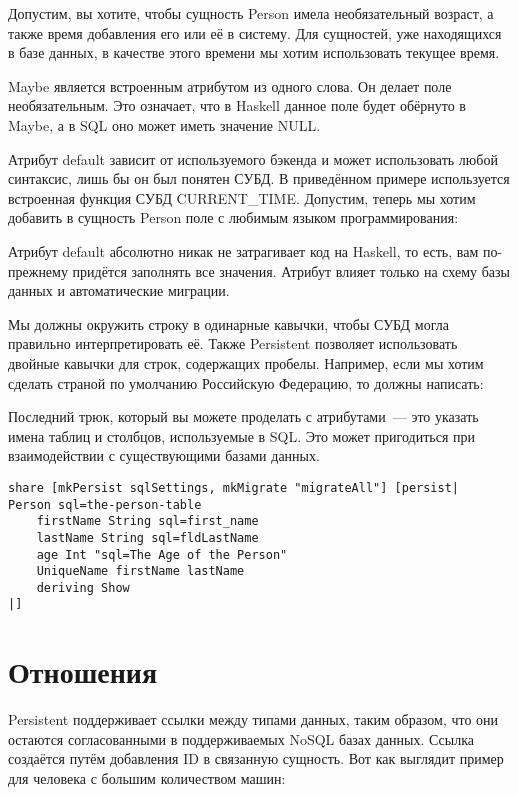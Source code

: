 Допустим, вы хотите, чтобы сущность Person имела необязательный возраст, а
также время добавления его или её в систему. Для сущностей, уже находящихся в
базе данных, в качестве этого времени мы хотим использовать текущее время.


Maybe является встроенным атрибутом из одного слова. Он делает поле
необязательным. Это означает, что в Haskell данное поле будет обёрнуто в Maybe,
а в SQL оно может иметь значение NULL.

Атрибут default зависит от используемого бэкенда и может использовать любой
синтаксис, лишь бы он был понятен СУБД. В приведённом примере используется
встроенная функция СУБД CURRENT\_TIME. Допустим, теперь мы хотим добавить в
сущность Person поле с любимым языком программирования:


\begin{remark}
    Атрибут default абсолютно никак не затрагивает код на Haskell, то есть, вам
    по-прежнему придётся заполнять все значения. Атрибут влияет только на схему
    базы данных и автоматические миграции.
\end{remark}

Мы должны окружить строку в одинарные кавычки, чтобы СУБД могла правильно
интерпретировать её. Также Persistent позволяет использовать двойные кавычки
для строк, содержащих пробелы. Например, если мы хотим сделать страной по
умолчанию Российскую Федерацию, то должны написать:


Последний трюк, который вы можете проделать с атрибутами~--- это указать имена
таблиц и столбцов, используемые в SQL. Это может пригодиться при взаимодействии
с существующими базами данных.

\begin{lstlisting}
share [mkPersist sqlSettings, mkMigrate "migrateAll"] [persist|
Person sql=the-person-table
    firstName String sql=first_name
    lastName String sql=fldLastName
    age Int "sql=The Age of the Person"
    UniqueName firstName lastName
    deriving Show
|]
\end{lstlisting}

\section{Отношения}

Persistent поддерживает ссылки между типами данных, таким образом, что они
остаются согласованными в поддерживаемых NoSQL базах данных. Ссылка создаётся
путём добавления ID в связанную сущность. Вот как выглядит пример для человека
с большим количеством машин:

